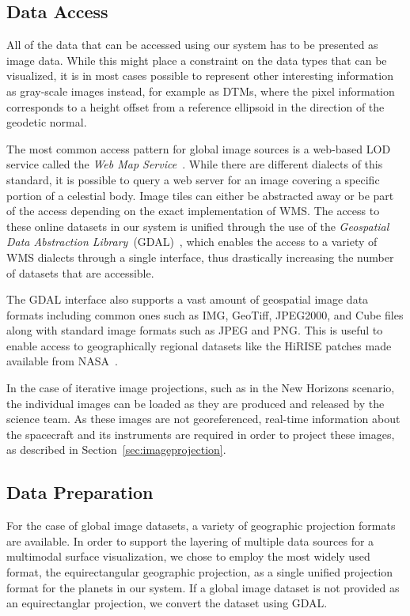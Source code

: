 \documentclass[journal]{vgtc}                %
\begin{document}
\subsection{Data Access} \label{sec:dataaccess}
All of the data that can be accessed using our system has to be presented as image data.
While this might place a constraint on the data types that can be visualized, it is in most cases possible to represent other interesting information as gray-scale images instead, for example as DTMs, where the pixel information corresponds to a height offset from a reference ellipsoid in the direction of the geodetic normal.

The most common access pattern for global image sources is a web-based LOD service called the \emph{Web Map Service}~\cite{open2006opengis, maso2010opengis}.
While there are different dialects of this standard, it is possible to query a web server for an image covering a specific portion of a celestial body. Image tiles can either be abstracted away or be part of the access depending on the exact implementation of WMS.
The access to these online datasets in our system is unified through the use of the \emph{Geospatial Data Abstraction Library}~(GDAL)~\cite{warmerdam2008geospatial}, which enables the access to a variety of WMS dialects through a single interface, thus drastically increasing the number of datasets that are accessible.

The GDAL interface also supports a vast amount of geospatial image data formats including common ones such as IMG, GeoTiff, JPEG2000, and Cube files along with standard image formats such as JPEG and PNG. This is useful to enable access to geographically regional datasets like the HiRISE patches made available from NASA~\cite{mcewen2016people}.

In the case of iterative image projections, such as in the New Horizons scenario, the individual images can be loaded as they are produced and released by the science team.
As these images are not georeferenced, real-time information about the spacecraft and its instruments are required in order to project these images, as described in Section~\ref{sec:imageprojection}.

\subsection{Data Preparation} \label{sec:processing}
For the case of global image datasets, a variety of geographic projection formats are available.
In order to support the layering of multiple data sources for a multimodal surface visualization, we chose to employ the most widely used format, the equirectangular geographic projection, as a single unified projection format for the planets in our system.
If a global image dataset is not provided as an equirectanglar projection, we convert the dataset using GDAL.
\end{document}
